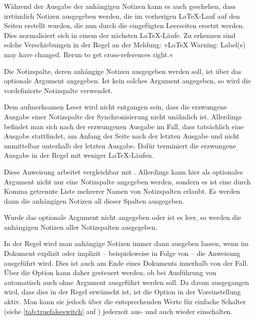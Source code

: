 Während der Ausgabe der anhängigen Notizen kann es auch geschehen, dass
irrtümlich Notizen ausgegeben werden, die im
vorherigen \LaTeX-Lauf auf den Seiten erstellt wurden, die nun durch die
eingefügten Leerseiten ersetzt werden. Dies normalisiert sich in einem der
nächsten \LaTeX-Läufe. Zu erkennen sind solche Verschiebungen in der Regel an
der Meldung: »\LaTeX{} Warning: Label(s) may have changed. Rerun to get
cross-references right.«

Die Notizspalte, deren anhängige Notizen ausgegeben werden soll, ist über das
optionale Argument  angegeben. Ist kein solches
Argument angegeben, so wird die vordefinierte Notizspalte 
verwendet.

Dem aufmerksamen Leser wird nicht entgangen sein, dass die
erzwungene Ausgabe einer
Notizspalte der Synchronisierung nicht unähnlich ist. Allerdings befindet man
sich nach der erzwungenen Ausgabe im Fall, dass tatsächlich eine Ausgabe
stattfindet, am Anfang der Seite nach der letzten Ausgabe und nicht
unmittelbar unterhalb der letzten Ausgabe. Dafür terminiert die erzwungene
Ausgabe in der Regel mit weniger \LaTeX-Läufen.%
\EndIndexGroup


\begin{Declaration}
\end{Declaration}
Diese Anweisung arbeitet vergleichbar mit
. Allerdings kann hier als optionales
Argument nicht nur eine Notizspalte angegeben werden, sondern es ist eine
durch Komma getrennte Liste mehrerer Namen von Notizspalten erlaubt. Es werden
dann die anhängigen Notizen all dieser Spalten ausgegeben.

Wurde das optionale Argument nicht angegeben oder ist es leer, so werden die
anhängigen Notizen aller Notizspalten ausgegeben.%
\EndIndexGroup


\begin{Declaration}
\end{Declaration}
In der Regel wird man anhängige Notizen immer dann ausgeben lassen, wenn im
Dokument explizit oder implizit -- beispielsweise in Folge von
 -- die Anweisung 
ausgeführt wird. Dies ist auch am Ende eines Dokuments innerhalb von
 der Fall. Über die Option
 kann daher gesteuert werden, ob bei Ausführung
von  automatisch auch
 ohne Argument ausgeführt werden
soll. Da davon ausgegangen wird, dass dies in der Regel erwünscht ist, ist die
Option in der Voreinstellung aktiv. Man kann sie jedoch über die
entsprechenden Werte für einfache Schalter (siehe
\autoref{tab:truefalseswitch} auf ) jederzeit
aus- und auch wieder einschalten.

